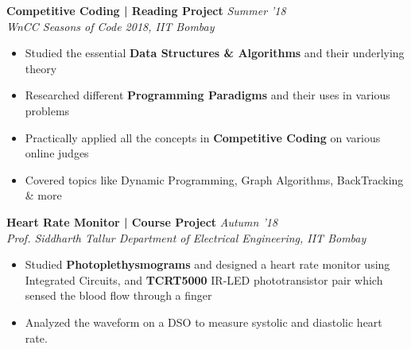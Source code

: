 \documentclass[11pt]{article}%
\begin{document}
{\flushleft \bf \large{Competitive Coding | Reading Project}} \hfill {{{\em{Summer '18}}}} \\
{\em{WnCC Seasons of Code 2018, IIT Bombay}}
\vspace{-1mm}
\begin{itemize}
\setlength\itemsep{0.01em}
\vspace{-1mm}
\item Studied the essential {\bf Data Structures \& Algorithms} and their underlying theory 
\vspace{-1mm}
\item Researched different {\bf Programming Paradigms} and their uses in various problems
\vspace{-1mm}
\item Practically applied all the concepts in {\bf Competitive Coding} on various online judges
\vspace{-1mm}
\item Covered topics like Dynamic Programming, Graph Algorithms, BackTracking \& more
\end{itemize}
\vspace{-0.5cm}

{\flushleft \bf \large{Heart Rate Monitor | Course Project}} \hfill  \hfill {{\em{Autumn '18} }}\\
{\em{Prof. Siddharth Tallur \textbar Department of Electrical Engineering, IIT Bombay}}
\begin{itemize}
\vspace{-2mm}
\setlength\itemsep{0.01em}
\item Studied {\bf Photoplethysmograms} and designed a heart rate monitor using Integrated Circuits, and {\bf TCRT5000} IR-LED phototransistor pair which sensed the blood flow through a finger
\vspace{-1.2mm}
\item Analyzed the waveform on a DSO to measure systolic and diastolic heart rate.
\vspace{-1.2mm}
\end{itemize}
\vspace{-0.4cm}
\end{document}
